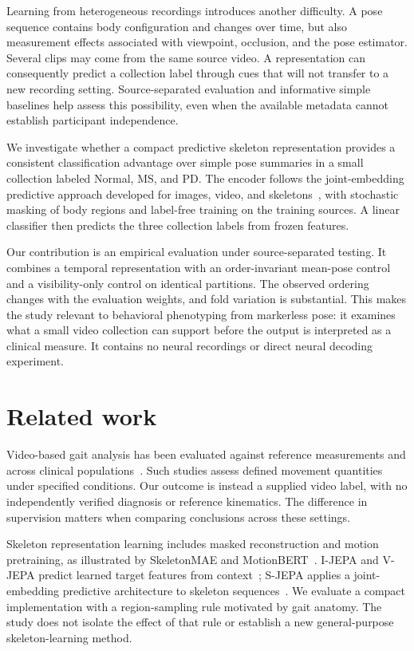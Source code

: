 \documentclass[10pt,twocolumn,letterpaper]{article}
\begin{document}
Learning from heterogeneous recordings introduces another difficulty. A pose sequence contains body configuration and changes over time, but also measurement effects associated with viewpoint, occlusion, and the pose estimator. Several clips may come from the same source video. A representation can consequently predict a collection label through cues that will not transfer to a new recording setting. Source-separated evaluation and informative simple baselines help assess this possibility, even when the available metadata cannot establish participant independence.

We investigate whether a compact predictive skeleton representation provides a consistent classification advantage over simple pose summaries in a small collection labeled Normal, MS, and PD. The encoder follows the joint-embedding predictive approach developed for images, video, and skeletons~\cite{ijepa,vjepa,sjepa}, with stochastic masking of body regions and label-free training on the training sources. A linear classifier then predicts the three collection labels from frozen features.

Our contribution is an empirical evaluation under source-separated testing. It combines a temporal representation with an order-invariant mean-pose control and a visibility-only control on identical partitions. The observed ordering changes with the evaluation weights, and fold variation is substantial. This makes the study relevant to behavioral phenotyping from markerless pose: it examines what a small video collection can support before the output is interpreted as a clinical measure. It contains no neural recordings or direct neural decoding experiment.

\section{Related work}
Video-based gait analysis has been evaluated against reference measurements and across clinical populations~\cite{stenum2021,stenum2024}. Such studies assess defined movement quantities under specified conditions. Our outcome is instead a supplied video label, with no independently verified diagnosis or reference kinematics. The difference in supervision matters when comparing conclusions across these settings.

Skeleton representation learning includes masked reconstruction and motion pretraining, as illustrated by SkeletonMAE and MotionBERT~\cite{skeletonmae,motionbert}. I-JEPA and V-JEPA predict learned target features from context~\cite{ijepa,vjepa}; S-JEPA applies a joint-embedding predictive architecture to skeleton sequences~\cite{sjepa}. We evaluate a compact implementation with a region-sampling rule motivated by gait anatomy. The study does not isolate the effect of that rule or establish a new general-purpose skeleton-learning method.
\end{document}
